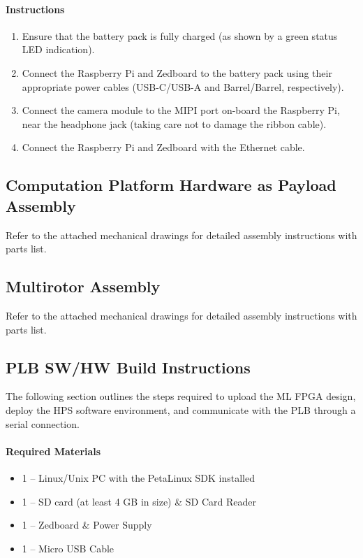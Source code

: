 \documentclass[10pt,letterpaper]{article}
\begin{document}
\paragraph{Instructions}
\begin{enumerate}
\item Ensure that the battery pack is fully charged (as shown by a green status LED indication).
\item Connect the Raspberry Pi and Zedboard to the battery pack using their appropriate power cables (USB-C/USB-A and Barrel/Barrel, respectively).
\item Connect the camera module to the MIPI port on-board the Raspberry Pi, near the headphone jack (taking care not to damage the ribbon cable).
\item Connect the Raspberry Pi and Zedboard with the Ethernet cable.
\end{enumerate}

\subsection{Computation Platform Hardware as Payload Assembly}
Refer to the attached mechanical drawings for detailed assembly instructions with parts list.

\subsection{Multirotor Assembly}
Refer to the attached mechanical drawings for detailed assembly instructions with parts list.

\subsection{PLB SW/HW Build Instructions}
\label{plb_setup}
The following section outlines the steps required to upload the ML FPGA design, deploy the HPS software environment, and communicate with the PLB through a serial connection.

\paragraph{Required Materials}
\begin{itemize}
\item 1 -- Linux/Unix PC with the PetaLinux SDK\cite{petalinux} installed
\item 1 -- SD card (at least 4 GB in size) \& SD Card Reader
\item 1 -- Zedboard \& Power Supply
\item 1 -- Micro USB Cable
\end{itemize}
\end{document}

